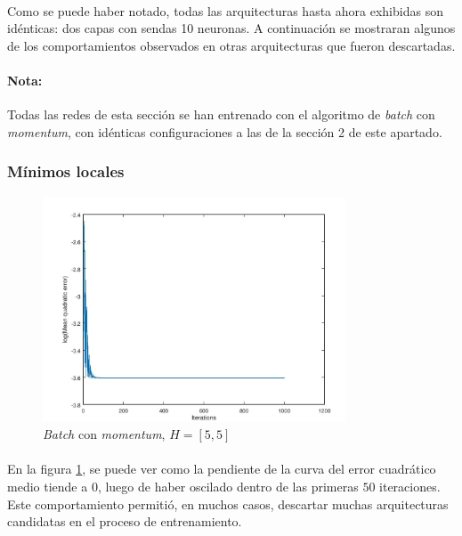 \documentclass[12pt, twocolumn]{article}
\begin{document}
	\paragraph{} Como se puede haber notado, todas las arquitecturas hasta ahora exhibidas son idénticas: dos capas con sendas 10 neuronas. A continuación se mostraran algunos de los comportamientos observados en otras arquitecturas que fueron descartadas.
	
	\paragraph{Nota:} Todas las redes de esta sección se han entrenado con el algoritmo de \textit{batch} con \textit{momentum}, con idénticas configuraciones a las de la sección 2 de este apartado. 
	
	\subsubsection{Mínimos locales}
	
	\begin{figure}[H]
		\centering
		\includegraphics[width=9cm]{../results/other_architectures/batch_momentum_5_5/b_m_5_5.jpg}
		\caption{\textit{Batch} con \textit{momentum}, $H = \left[5, 5\right]$}
		\label{bm55}
	\end{figure}
	
	\paragraph{} En la figura \ref{bm55}, se puede ver como la pendiente de la curva del error cuadrático medio tiende a $0$, luego de haber oscilado dentro de las primeras $50$ iteraciones. Este comportamiento permitió, en muchos casos, descartar muchas arquitecturas candidatas en el proceso de entrenamiento. 
	
\end{document}
